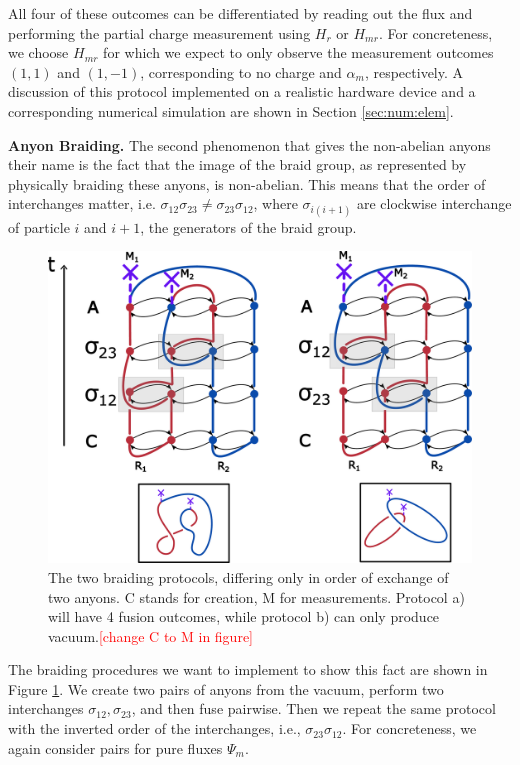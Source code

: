 \documentclass[two column]{article}
\newcommand{\caro}[1]{\textcolor{red}{[#1]}}
\begin{document}
All four of these outcomes can be differentiated by reading out the flux and performing the partial charge measurement using $H_r$ or $H_{mr}$. For concreteness, we choose $H_{mr}$ for which we expect to only observe the measurement outcomes $(1,1)$ and $(1,-1)$, corresponding to no charge and $\alpha_m$, respectively. A discussion of this protocol implemented on a realistic hardware device and a corresponding numerical simulation are shown in Section \ref{sec:num:elem}.



\textbf{Anyon Braiding.} The second phenomenon that gives the non-abelian anyons their name is the fact that the image of the braid group, as represented by physically braiding these anyons, is non-abelian. 
This means that the order of interchanges matter, i.e. $\sigma_{12}\sigma_{23} \neq \sigma_{23}\sigma_{12}$, where $\sigma_{i(i+1)}$ are clockwise interchange of particle $i$ and $i+1$, the generators of the braid group.


\begin{figure}
    \centering
    \includegraphics[width=\linewidth]{Figures/fluxBRAID.pdf}
    \caption{The two braiding protocols, differing only in order of exchange of two anyons. C stands for creation, M for measurements. Protocol a) will have 4 fusion outcomes, while protocol b) can only produce vacuum.\caro{change C to M in figure}}
    \label{fig:flux_braid}
\end{figure}

The braiding procedures we want to implement to show this fact are shown in Figure \ref{fig:flux_braid}. We create two pairs of anyons from the vacuum, perform two interchanges $\sigma_{12}, \sigma_{23}$, and then fuse pairwise. Then we repeat the same protocol with the inverted order of the interchanges, i.e., $\sigma_{23} \sigma_{12}$. For concreteness, we again consider pairs for pure fluxes $\Psi_m$. 
\end{document}
